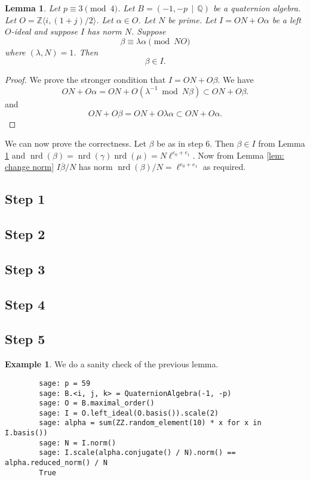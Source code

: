 \documentclass[10pt]{article}
\theoremstyle{plain}
\newtheorem{lemma}[theorem]{Lemma}
\theoremstyle{definition}
\newtheorem{example}[theorem]{Example}
\newcommand{\op}{\operatorname}
\newcommand{\Z}{\mathbb{Z}}
\newcommand{\Q}{\mathbb{Q}}
\newcommand{\nrd}{\op{nrd}}
\begin{document}
\begin{lemma} \label{lem: beta in I}
    Let \( p \equiv 3 \pmod{4} \).
    Let \( B =  (-1, -p \, \mid \, \Q) \) be a quaternion algebra.
    Let \( O = \Z \langle i, (1+j) / 2 \rangle \).
    Let \( \alpha \in O \).
    Let \( N \) be prime.
    Let \( I = ON + O\alpha \) be a left \( O \)-ideal and suppose \( I \) has norm \( N \).
    Suppose
    \[
        \beta \equiv \lambda \alpha \pmod{NO}
    \]
    where \( (\lambda, N) = 1 \).
    Then
    \[
        \beta \in I.
    \]
\end{lemma}
\begin{proof}
    We prove the stronger condition that \( I = ON + O\beta \).
    We have
    \[
        ON + O\alpha
        = ON + O(\lambda^{-1} \bmod{N}\beta)
        \subset ON + O\beta .
    \]
    and
    \[
        ON + O\beta
        = ON + O\lambda \alpha
        \subset ON + O\alpha .
    \]
\end{proof}

We can now prove the correctness.
Let \( \beta \) be as in step 6.
Then \( \beta \in I \) from Lemma \ref{lem: beta in I} and \( \nrd(\beta) = \nrd(\gamma) \nrd(\mu) = N\ell^{e_0 + e_1} \).
Now from Lemma \ref{lem: change norm} \( I\overline{\beta}/N \) has norm \( \nrd(\beta) / N = \ell^{e_0 + e_1} \) as required.

\subsection{Step 1}
\subsection{Step 2}
\subsection{Step 3}
\subsection{Step 4}
\subsection{Step 5}




\begin{example}
    We do a sanity check of the previous lemma.
    \begin{lstlisting}
        sage: p = 59
        sage: B.<i, j, k> = QuaternionAlgebra(-1, -p)
        sage: O = B.maximal_order()
        sage: I = O.left_ideal(O.basis()).scale(2)
        sage: alpha = sum(ZZ.random_element(10) * x for x in I.basis())
        sage: N = I.norm()
        sage: I.scale(alpha.conjugate() / N).norm() == alpha.reduced_norm() / N
        True
    \end{lstlisting}
\end{example}
\end{document}
